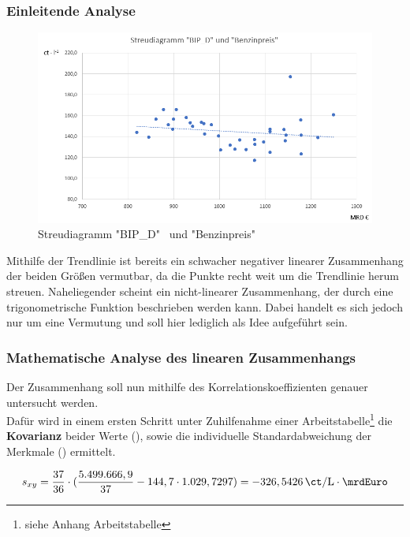 \subsubsection{Einleitende Analyse}
\begin{figure}[H]
  \centering
  \includegraphics[width = \textwidth]{graphics/streubipbenz.png}
  \caption{Streudiagramm "BIP\_D" \, und "Benzinpreis"}
  \label{fig:streuBipBenz}
\end{figure}

Mithilfe der Trendlinie ist bereits ein schwacher negativer linearer Zusammenhang der beiden Größen vermutbar, da die Punkte recht weit um die Trendlinie herum streuen. Naheliegender scheint ein nicht-linearer Zusammenhang, der durch eine trigonometrische Funktion beschrieben werden kann. Dabei handelt es sich jedoch nur um eine Vermutung und soll hier lediglich als Idee aufgeführt sein.\\

\subsubsection{Mathematische Analyse des linearen Zusammenhangs}
Der Zusammenhang soll nun mithilfe des Korrelationskoeffizienten genauer untersucht werden.\\
Dafür wird in einem ersten Schritt unter Zuhilfenahme einer Arbeitstabelle\footnote{siehe Anhang Arbeitstabelle} die \textbf{Kovarianz} beider Werte (), sowie die individuelle Standardabweichung der Merkmale () ermittelt.

\begin{align}
  s_{xy} = \frac{37}{36} \cdot (\frac{5.499.666,9}{37} - 144,7 \cdot 1.029,7297) = -326,5426 \, \si{\ct\per\liter} \cdot \si{\mrdEuro}
\end{align}

